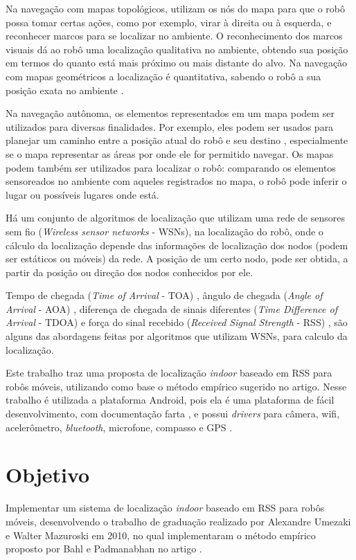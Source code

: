 	Na navegação com mapas topológicos, utilizam os nós do mapa para que o robô possa tomar certas ações, como por
exemplo, virar à direita ou à esquerda, e reconhecer marcos para se localizar no ambiente. 
O reconhecimento dos marcos visuais dá ao robô uma localização qualitativa no ambiente,
obtendo sua posição em termos do quanto está mais próximo ou mais distante do alvo. Na
navegação com mapas geométricos a localização é quantitativa, sabendo o robô a sua posição
exata no ambiente \cite{construcaoMapas}.

	Na navegação autônoma, os elementos representados em um mapa podem ser utilizados para diversas finalidades. Por exemplo,
eles podem ser usados para planejar um caminho entre a posição atual do robô e seu
destino \cite{cnn}, especialmente se o mapa representar as áreas por onde ele for permitido navegar. Os mapas podem também ser
utilizados para localizar o robô: comparando os elementos sensoreados no ambiente com aqueles registrados no mapa, o robô pode
inferir o lugar ou possíveis lugares onde está.
	
	Há um conjunto de algoritmos de localização que utilizam uma rede de sensores sem fio (\textit{Wireless sensor networks} - WSNs), 
	na localização do robô, 
	onde o cálculo da localização depende das informações de localização dos nodos (podem ser estáticos ou móveis) da rede\cite{omc}.
	A posição de um certo nodo, pode ser obtida, a partir da posição ou direção dos nodos conhecidos por ele.%
	
	Tempo de chegada (\textit{Time of Arrival} - TOA) \cite{gps}, ângulo de chegada (\textit{Angle of Arrival} - AOA) \cite{aoa}, 
	diferença de chegada de sinais diferentes (\textit{Time Difference of Arrival} - TDOA) \cite{tdoa} 
	e força do sinal recebido (\textit{Received Signal Strength} - RSS) \cite{wifiRadar}, são alguns das abordagens feitas por algoritmos que utilizam WSNs,
	para calculo da localização.
	
	Este trabalho traz uma proposta de localização \textit{indoor} baseado em RSS para robôs móveis,
	utilizando como base o método empírico sugerido no artigo\cite{wifiRadar}. Nesse trabalho
	é utilizada a plataforma Android, pois ela \cite{androidSite} é uma plataforma de fácil desenvolvimento, 
	com documentação farta \cite{androidDev}, e possui \textit{drivers} para câmera, wifi, acelerômetro, 
	\textit{bluetooth}, microfone, compasso e GPS \cite{androidRobot}. 
  
\clearpage
\section{Objetivo}
	Implementar um sistema de localização \textit{indoor} baseado em RSS para robôs móveis,
	desenvolvendo o trabalho de graduação realizado por 
  Alexandre Umezaki e Walter Mazuroski em 2010, no qual implementaram o método empírico proposto
  por Bahl e Padmanabhan no artigo \cite{wifiRadar}.
  
